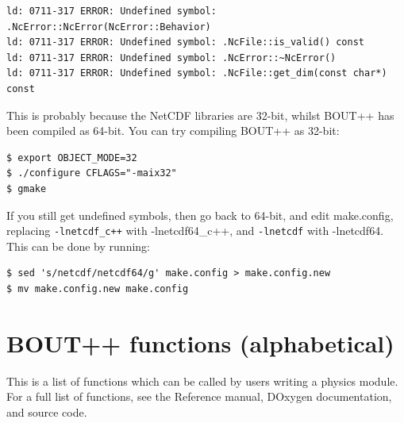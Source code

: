 \documentclass[12pt]{article}
\newcommand{\code}[1]{\texttt{#1}}
\begin{document}
%
\begin{verbatim}
ld: 0711-317 ERROR: Undefined symbol: .NcError::NcError(NcError::Behavior)
ld: 0711-317 ERROR: Undefined symbol: .NcFile::is_valid() const
ld: 0711-317 ERROR: Undefined symbol: .NcError::~NcError()
ld: 0711-317 ERROR: Undefined symbol: .NcFile::get_dim(const char*) const
\end{verbatim}
%
This is probably because the NetCDF libraries are 32-bit, whilst BOUT++ has
been compiled as 64-bit.  You can try compiling BOUT++ as 32-bit:
%
\begin{verbatim}
$ export OBJECT_MODE=32
$ ./configure CFLAGS="-maix32"
$ gmake
\end{verbatim}
%
If you still get undefined symbols, then go back to 64-bit, and edit
make.config, replacing \code{-lnetcdf\_c++} with {-lnetcdf64\_c++}, and
\code{-lnetcdf} with {-lnetcdf64}. This can be done by running:
%
\begin{verbatim}
$ sed 's/netcdf/netcdf64/g' make.config > make.config.new
$ mv make.config.new make.config
\end{verbatim}
%





\section{BOUT++ functions (alphabetical)}
%
This is a list of functions which can be called by users writing a physics
module. For a full list of functions, see the Reference manual, DOxygen
documentation, and source code.
\end{document}
